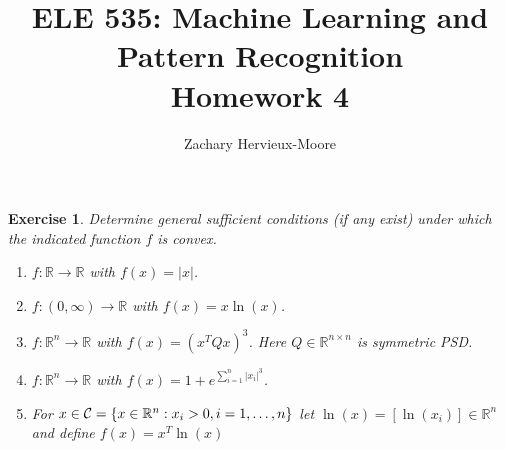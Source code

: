 \documentclass[12pt]{article}
\title{ELE 535: Machine Learning and Pattern Recognition \\ Homework 4}
\author{Zachary Hervieux-Moore}
\date{\displaydate{date}}
\theoremstyle{colon}
\newtheorem{exercise}{Exercise}
\begin{document}
\maketitle

\clearpage

\begin{exercise}
  Determine general sufficient conditions (if any exist) under which the indicated function $f$ is convex.

  \begin{enumerate}[label=\alph*)]
    \item $f: \mathbb{R} \rightarrow \mathbb{R}$ with $f(x) = \lvert x \rvert$.
    \item $f: (0, \infty) \rightarrow \mathbb{R}$ with $f(x) = x \ln (x)$.
    \item $f: \mathbb{R}^n \rightarrow \mathbb{R}$ with $f(x) = (x^T Q x)^3$. Here $Q \in \mathbb{R}^{n \times n}$ is symmetric PSD.
    \item $f: \mathbb{R}^n \rightarrow \mathbb{R}$ with $f(x) = 1 + e^{\sum_{i=1}^n \lvert x_i \rvert^3}$.
    \item For $x \in \mathcal{C} = \{ x \in \mathbb{R}^n: x_i > 0, i = 1, \mathellipsis, n \}$ let $\ln(x) = [\ln(x_i)] \in \mathbb{R}^n$ and define $f(x) = x^T \ln(x)$
  \end{enumerate}
\end{exercise}
\end{document}
